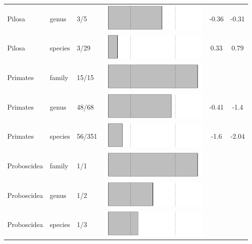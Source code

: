 \begin{longtable}{lL{1.8cm}C{2cm}ccc}
  Pilosa & genus & 3/5 & \includegraphics[width=0.20\linewidth, height=0.05\linewidth]{Missing_mammals/Table_figures/bar62.pdf} & -0.36 & -0.31 \\ 
  Pilosa & species & 3/29 & \includegraphics[width=0.20\linewidth, height=0.05\linewidth]{Missing_mammals/Table_figures/bar63.pdf} & 0.33 & 0.79 \\ 
  Primates & family & 15/15 & \includegraphics[width=0.20\linewidth, height=0.05\linewidth]{Missing_mammals/Table_figures/bar64.pdf} &   &   \\ 
  Primates & genus & 48/68 & \includegraphics[width=0.20\linewidth, height=0.05\linewidth]{Missing_mammals/Table_figures/bar65.pdf} & -0.41 & -1.4 \\ 
  Primates & species & 56/351 & \includegraphics[width=0.20\linewidth, height=0.05\linewidth]{Missing_mammals/Table_figures/bar66.pdf} & -1.6 & -2.04 \\ 
  Proboscidea & family & 1/1 & \includegraphics[width=0.20\linewidth, height=0.05\linewidth]{Missing_mammals/Table_figures/bar67.pdf} &   &   \\ 
  Proboscidea & genus & 1/2 & \includegraphics[width=0.20\linewidth, height=0.05\linewidth]{Missing_mammals/Table_figures/bar68.pdf} &   &   \\ 
  Proboscidea & species & 1/3 & \includegraphics[width=0.20\linewidth, height=0.05\linewidth]{Missing_mammals/Table_figures/bar69.pdf} &   &   \\ 

\end{longtable}
